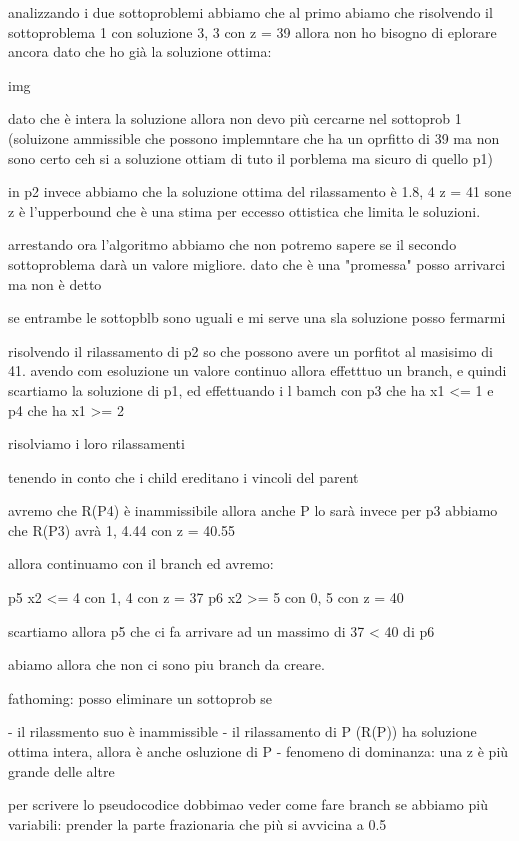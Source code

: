 analizzando i due sottoproblemi abbiamo che al primo abiamo che risolvendo il sottoproblema 1 con soluzione 3, 3 con z = 39 allora non ho bisogno di eplorare ancora dato che ho già la soluzione ottima:

img

dato che è intera la soluzione allora non devo più cercarne nel sottoprob 1 (soluizone ammissible che possono implemntare che ha un oprfitto di 39 ma non sono certo ceh si a soluzione ottiam di tuto il porblema ma sicuro di quello p1)


in p2 invece abbiamo che la soluzione ottima del rilassamento è 1.8, 4 z = 41 sone z è l'upperbound che è una stima per eccesso ottistica che limita le soluzioni.

arrestando ora l'algoritmo abbiamo che non potremo sapere se il secondo sottoproblema darà un valore migliore. dato che è una "promessa" posso arrivarci ma non è detto

se entrambe le sottopblb sono uguali e mi serve una sla soluzione posso fermarmi









risolvendo il rilassamento di p2 so che possono avere un porfitot al masisimo di 41. avendo com esoluzione un valore continuo allora effetttuo un branch, e quindi scartiamo la soluzione di p1, ed effettuando i l bamch con p3 che ha  x1 <= 1 e p4 che ha x1 >= 2

risolviamo i loro rilassamenti 

tenendo in conto che i child ereditano i vincoli del parent


avremo che R(P4) è inammissibile allora anche P lo sarà
invece per p3 abbiamo che R(P3) avrà 1, 4.44 con z = 40.55

allora continuamo con il branch ed avremo:

p5 x2 <= 4 con 1, 4 con z = 37
p6 x2 >= 5 con 0, 5 con z = 40

scartiamo allora p5 che ci fa arrivare ad un massimo di 37 < 40 di p6

abiamo allora che non ci sono piu branch da creare.

fathoming: posso eliminare un sottoprob se

- il rilassmento suo è inammissible
- il rilassamento di P (R(P)) ha soluzione ottima intera, allora è anche osluzione di P
- fenomeno di dominanza: una z è più grande delle altre


per scrivere lo pseudocodice dobbimao veder come fare branch se abbiamo più variabili: prender la parte frazionaria che più si avvicina a 0.5



